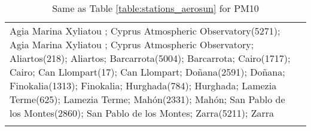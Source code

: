 \documentclass[journal abbreviation, manuscript]{copernicus}
\begin{document}
\begin{table}
\begin{tabularx}{\textwidth}{lX}
                                                                                                                                                                                                                                                                                                                                                                                                                                                                                                                                                                                                                                                                                                                                                                                                                                                                                                                                                                                                                                                                                                                                                                                                                                                                            Agia Marina Xyliatou ; Cyprus Atmospheric Observatory(5271); Agia Marina Xyliatou ; Cyprus Atmospheric Observatory; Aliartos(218); Aliartos; Barcarrota(5004); Barcarrota; Cairo(1717); Cairo; Can Llompart(17); Can Llompart; Doñana(2591); Doñana; Finokalia(1313); Finokalia; Hurghada(784); Hurghada; Lamezia Terme(625); Lamezia Terme; Mahón(2331); Mahón; San Pablo de los Montes(2860); San Pablo de los Montes; Zarra(5211); Zarra \\
     \bottomhline
 \end{tabularx}
 \caption{Same as Table \ref{table:stations_aerosun} for PM10}
 \label{table:stations_pm10}
\end{table}

\clearpage
\end{document}
